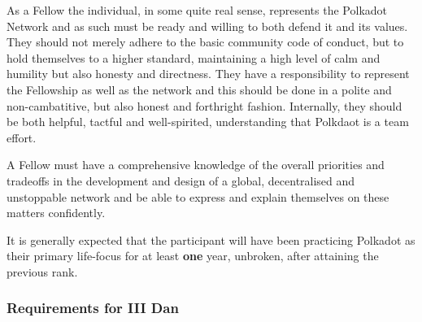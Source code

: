 \documentclass[9pt,oneside]{amsart}
\begin{document}
As a Fellow the individual, in some quite real sense, represents the Polkadot Network and as such must be ready and willing to both defend it and its values. They should not merely adhere to the basic community code of conduct, but to hold themselves to a higher standard, maintaining a high level of calm and humility but also honesty and directness. They have a responsibility to represent the Fellowship as well as the network and this should be done in a polite and non-cambatitive, but also honest and forthright fashion. Internally, they should be both helpful, tactful and well-spirited, understanding that Polkdaot is a team effort.

A Fellow must have a comprehensive knowledge of the overall priorities and tradeoffs in the development and design of a global, decentralised and unstoppable network and be able to express and explain themselves on these matters confidently.

It is generally expected that the participant will have been practicing Polkadot as their primary life-focus for at least \textbf{one} year, unbroken, after attaining the previous rank.

\subsubsection{Requirements for III Dan}\label{requirements-3}
\end{document}
